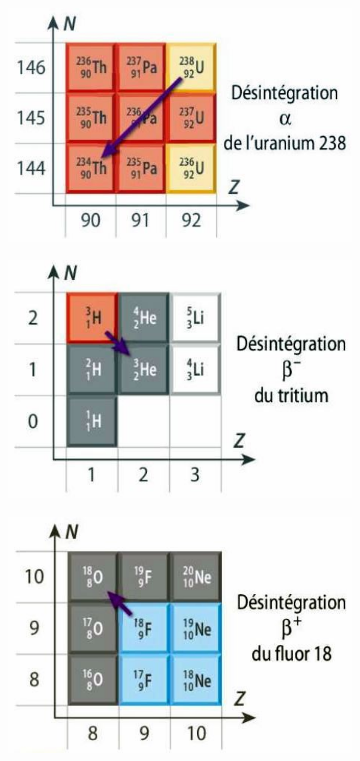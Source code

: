 \documentclass[11pt,a4paper]{article}
\begin{document}
\begin{figure}[H]
\centering
\begin{subfigure}{.26\textwidth}
  \centering
  \includegraphics[width=.95\linewidth]{imgs/p8/alpha.jpg}  
\end{subfigure}
\begin{subfigure}{.26\textwidth}
  \centering
  \includegraphics[width=.95\linewidth]{imgs/p8/beta-.jpg}  
\end{subfigure}
\begin{subfigure}{.26\textwidth}
  \centering
  \includegraphics[width=.95\linewidth]{imgs/p8/beta+.jpg}  

\end{subfigure}
\end{figure}
\end{document}
